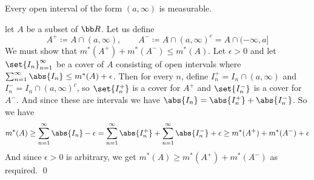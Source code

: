 \bthrm

    Every open interval of the form $(a,\infty)$ is measurable.

\ethrm

\Proof let $A$ be a subset of ${\bb R}$.
Let us define
$$ A^+ \coloneqq A\cap(a,\infty),\qquad A^- \coloneqq A\cap(a,\infty)^c = A\cap(-\infty,a] $$
We must show that $m^*(A^+)+m^*(A^-)\leq m^*(A)$.
Let $\epsilon>0$ and let $\set{I_n}_{n=1}^\infty$ be a cover of $A$ consisting of open intervals where $\sum_{n=1}^\infty\abs{I_n}\leq m^*(A)+\epsilon$.
Then for every $n$, define $I_n^+=I_n\cap(a,\infty)$ and $I_n^-=I_n\cap(a,\infty)^c$, so $\set{I_n^+}$ is a cover for $A^+$ and $\set{I_n^-}$ is a cover for $A^-$.
And since these are intervals we have $\abs{I_n}=\abs{I_n^+}+\abs{I_n^-}$.
So we have
$$ m^*(A) \geq \sum_{n=1}^\infty\abs{I_n}-\epsilon = \sum_{n=1}^\infty\abs{I_n^+} + \sum_{n=1}^\infty\abs{I_n^-} + \epsilon \geq m^*(A^+) + m^*(A^-) + \epsilon $$
And since $\epsilon>0$ is arbitrary, we get $m^*(A)\geq m^*(A^+)+m^*(A^-)$ as required.
\qed

\bye

